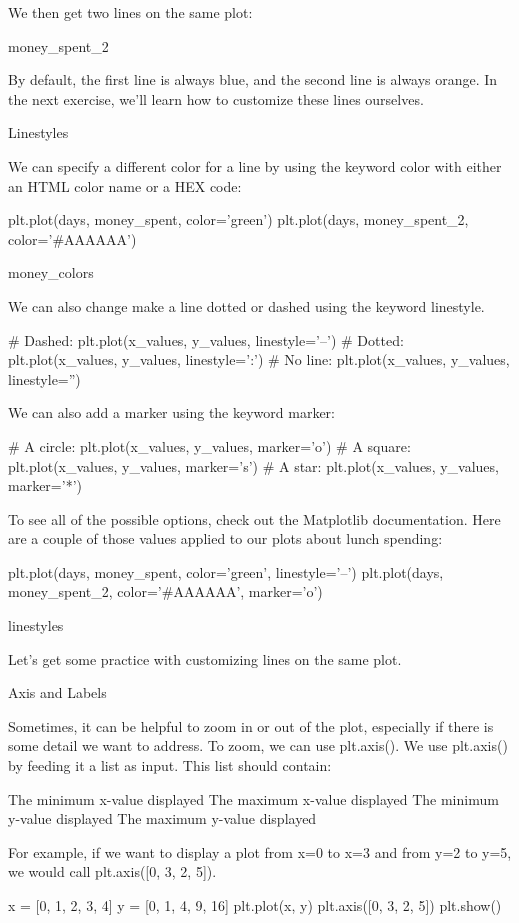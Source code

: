 \documentclass{journal}
\begin{document}
We then get two lines on the same plot:

money_spent_2

By default, the first line is always blue, and the second line is always orange. In the next exercise, we’ll learn how to customize these lines ourselves.


Linestyles

We can specify a different color for a line by using the keyword color with either an HTML color name or a HEX code:

plt.plot(days, money_spent, color='green')
plt.plot(days, money_spent_2, color='#AAAAAA')

money_colors

We can also change make a line dotted or dashed using the keyword linestyle.

# Dashed:
plt.plot(x_values, y_values, linestyle='--')
# Dotted:
plt.plot(x_values, y_values, linestyle=':')
# No line:
plt.plot(x_values, y_values, linestyle='')

We can also add a marker using the keyword marker:

# A circle:
plt.plot(x_values, y_values, marker='o')
# A square:
plt.plot(x_values, y_values, marker='s')
# A star:
plt.plot(x_values, y_values, marker='*')

To see all of the possible options, check out the Matplotlib documentation. Here are a couple of those values applied to our plots about lunch spending:

plt.plot(days, money_spent, color='green', linestyle='--')
plt.plot(days, money_spent_2, color='#AAAAAA',  marker='o')

linestyles

Let’s get some practice with customizing lines on the same plot.



Axis and Labels

Sometimes, it can be helpful to zoom in or out of the plot, especially if there is some detail we want to address. To zoom, we can use plt.axis(). We use plt.axis() by feeding it a list as input. This list should contain:

    The minimum x-value displayed
    The maximum x-value displayed
    The minimum y-value displayed
    The maximum y-value displayed

For example, if we want to display a plot from x=0 to x=3 and from y=2 to y=5, we would call plt.axis([0, 3, 2, 5]).

x = [0, 1, 2, 3, 4]
y = [0, 1, 4, 9, 16]
plt.plot(x, y)
plt.axis([0, 3, 2, 5])
plt.show()
\end{document}
